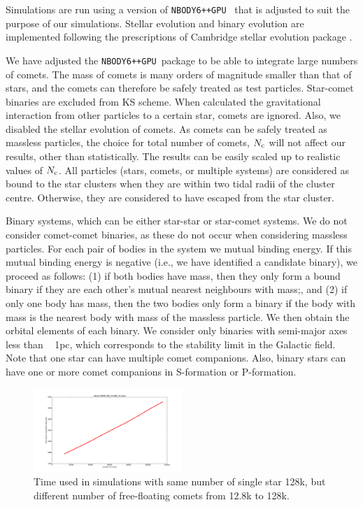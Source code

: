 \documentclass[usenatbib]{mn2e}
\newcommand{\ncomets}{N_{\rm c}}
\newcommand{\nb}{\texttt{NBODY6++GPU}}
\begin{document}
Simulations are run using a version of \nb\ \citep{Wang:2015ab} that is adjusted to suit the purpose of our simulations. Stellar evolution and binary evolution are implemented following the prescriptions of Cambridge stellar evolution package \citep{Eggleton:1989aa, Hurley:2000aa}.

We have adjusted the \nb\ package to be able to integrate large numbers of comets. The mass of comets is many orders of magnitude smaller than that of stars, and the comets can therefore be safely treated as test particles. Star-comet binaries are excluded from KS scheme. When calculated the gravitational interaction from other particles to a certain star, comets are ignored. Also, we disabled the stellar evolution of comets. %
As comets can be safely treated as massless particles, the choice for total number of comets, $\ncomets$ will not affect our results, other than statistically. The results can be easily scaled up to realistic values of $\ncomets$. 
All particles (stars, comets, or multiple systems) are considered as bound to the star clusters when they are within two tidal radii of the cluster centre. Otherwise, they are considered to have escaped from the star cluster.

Binary systems, which can be either star-star or star-comet systems. We do not consider comet-comet binaries, as these do not occur when considering massless particles. For each pair of bodies in the system we mutual binding energy. If this mutual binding energy is negative (i.e., we have identified a candidate binary), we proceed as follows: (1) if both bodies have mass, then they only form a bound binary if they are each other's mutual nearest neighbours with mass;, and (2) if only one body has mass, then the two bodies only form a binary if the body with mass is the nearest body with mass of the massless particle. We then obtain the orbital elements of each binary. We consider only binaries with semi-major axes less than ~ 1pc, which corresponds to the stability limit in the Galactic field. Note that one star can have multiple comet companions. Also, binary stars can have one or more comet companions in S-formation or P-formation.

\begin{figure}
  \centering
  \includegraphics[width=0.5\textwidth,height=!]{time_used.pdf}
  \caption{Time used in simulations with same number of single star 128k, but different number of free-floating comets from 12.8k to 128k.}
  \label{fig:time_used}
\end{figure}
\end{document}
